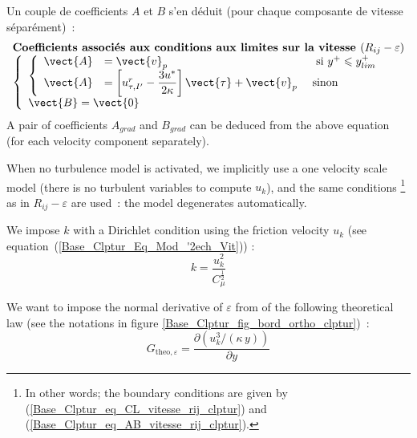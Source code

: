 Un couple de coefficients $A$ et $B$ s'en d\'eduit (pour
chaque composante de vitesse s\'epar\'ement)~:
\begin{equation}\label{Base_Clptur_eq_AB_vitesse_rij_clptur}
\begin{array}{l}
\text{\bf Coefficients associ\'es aux conditions aux limites sur la vitesse }(R_{ij}-\varepsilon)\\
\left\{\begin{array}{l}
\left\{\begin{array}{lll}
\vect{A}&=\vect{v}_p& \text{ \ si\ } y^+\leqslant y^+_{lim} \\
\vect{A}&=\left[u^r_{\tau,I'}-\displaystyle\frac{3u^*}{2\kappa } \right]\vect{\tau}
+\vect{v}_p &\text{ sinon }
\end{array}\right.\\
\vect{B}= \vect{0}
\end{array}\right.
\end{array}
\end{equation}
A pair of coefficients $A_{grad}$ and $B_{grad}$ can be deduced 
from the above equation 
(for each velocity component separately).


When no turbulence model is activated, we implicitly use a one velocity 
scale model (there is no turbulent variables to compute  $u_k$), and the same 
conditions
\footnote{In other words; the boundary conditions are given by  
 (\ref{Base_Clptur_eq_CL_vitesse_rij_clptur}) and 
(\ref{Base_Clptur_eq_AB_vitesse_rij_clptur}).}
 as in $R_{ij}-\varepsilon$ are used~: the model degenerates automatically. 



\newpage


We impose $k$ with a Dirichlet condition using the friction velocity
$u_k$ (see equation~(\ref{Base_Clptur_Eq_Mod_'2ech_Vit})) :
\begin{equation}
k= \displaystyle\frac{u_k^2}{C_\mu^\frac{1}{2}}
\end{equation}

We want to impose the normal derivative of  $\varepsilon$ from 
of the following theoretical law 
 (see the notations in figure \ref{Base_Clptur_fig_bord_ortho_clptur})~:
\begin{equation}\label{Base_Clptur_eq_partialep_theo_clptur}
G_{\text{theo},\varepsilon} = \displaystyle\frac{\partial \left(u_k^3/(\kappa\, y)\right)}{\partial y}
\end{equation}



